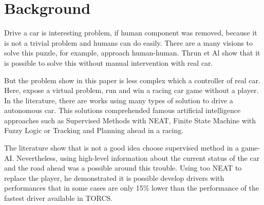 \section{Background}

Drive a car is interesting problem, if human component was removed, because it is not a trivial problem and humans can do easily. There are a many visions to solve this puzzle, for example, approach human-human. Thrun et Al \cite{Thrun06}  show that it is possible to solve this without manual intervention with real car.

But the problem show in this paper is less complex which a controller of real car. Here, expose a virtual problem, run and win a racing car game without a player. In the literature, there are works using many types of solution to drive a autonomous car. This solutions comprehended famous artificial intelligence approaches such as Supervised Methods with NEAT, Finite State Machine with Fuzzy Logic or Tracking and Planning ahead in a racing.

The literature show that is not a good idea choose supervised method in a game-AI. Nevertheless, \cite{learn} using high-level information about the current status of the car and the road ahead was a possible around this trouble. Using too NEAT to replace the player, he demonstrated it is possible develop drivers with performances that in some cases are only 15\% lower than the performance of the fastest driver available in TORCS.